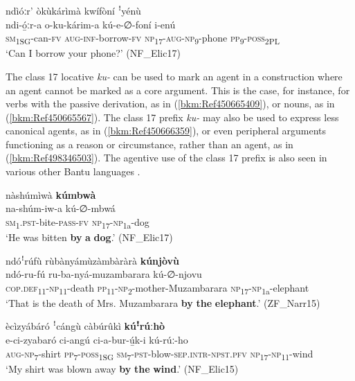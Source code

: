 \ea
\label{bkm:Ref485812447}
ndìóːr’ òkùkárìmà kwífòní ꜝyénù\\
\gll ndi-ó̲ːr-a  o-ku-kárim-a    kú-e-∅-foní      i-enú\\
\textsc{sm}\textsubscript{1SG}-can-\textsc{fv}  \textsc{aug}-\textsc{inf}-borrow-\textsc{fv}  \textsc{np}\textsubscript{17}-\textsc{aug}-\textsc{np}\textsubscript{9}-phone  \textsc{pp}\textsubscript{9}-\textsc{poss}\textsubscript{2PL}\\
\glt ‘Can I borrow your phone?’ (NF\_Elic17)
\z

The class 17 locative \textit{ku-} can be used to mark an agent in a construction where an agent cannot be marked as a core argument. This is the case, for instance, for verbs with the passive derivation, as in (\ref{bkm:Ref450665409}), or nouns, as in (\ref{bkm:Ref450665567}). The class 17 prefix \textit{ku-} may also be used to express less canonical agents, as in (\ref{bkm:Ref450666359}), or even peripheral arguments functioning as a reason or circumstance, rather than an agent, as in (\ref{bkm:Ref498346503}). The agentive use of the class 17 prefix is also seen in various other Bantu languages \citep{Fleisch2005}.

\ea
\label{bkm:Ref450665409}
nàshúmìwà \textbf{kúmbwà}\\
\gll na-shúm-iw-a    kú-∅-mbwá\\
\textsc{sm}\textsubscript{1}.\textsc{pst}-bite-\textsc{pass}-\textsc{fv}  \textsc{np}\textsubscript{17}-\textsc{np}\textsubscript{1a}-dog\\
\glt ‘He was bitten \textbf{by} \textbf{a} \textbf{dog}.’ (NF\_Elic17)
\z

\ea
\label{bkm:Ref450665567}
ndóꜝrúfù rùbànyámùzàmbàràrà \textbf{kúnjòvù}\\
\gll ndó-ru-fú      ru-ba-nyá-muzambarara    kú-∅-njovu\\
\textsc{cop}.\textsc{def}\textsubscript{11}-\textsc{np}\textsubscript{11}-death  \textsc{pp}\textsubscript{11}-\textsc{np}\textsubscript{2}-mother-Muzambarara  \textsc{np}\textsubscript{17}-\textsc{np}\textsubscript{1a}-elephant\\
\glt ‘That is the death of Mrs. Muzambarara \textbf{by} \textbf{the} \textbf{elephant}.’ (ZF\_Narr15)
\z

\ea
\label{bkm:Ref450666359}
ècìzyábáró ꜝcángù càbúrûkì \textbf{kúꜝ}\textbf{rúːhò}\\
\gll e-ci-zyabaró    ci-angú ci-a-bur-ú̲k-i        kú-rúː-ho\\
\textsc{aug}-\textsc{np}\textsubscript{7}-shirt  \textsc{pp}\textsubscript{7}-\textsc{poss}\textsubscript{1SG} \textsc{sm}\textsubscript{7}-\textsc{pst}-blow-\textsc{sep}.\textsc{intr}-\textsc{npst}.\textsc{pfv}  \textsc{np}\textsubscript{17}-\textsc{np}\textsubscript{11}-wind\\
\glt ‘My shirt was blown away \textbf{by} \textbf{the} \textbf{wind}.’ (NF\_Elic15)
\z

